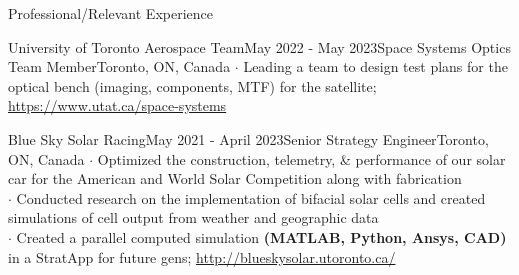 \documentclass[UTF8]{resume} %
\begin{document}
\begin{rSection}{Professional/Relevant Experience}
\begin{rSubsection}{University of Toronto Aerospace Team}{May 2022 - May 2023}{Space Systems Optics Team Member}{Toronto, ON, Canada}
    $\cdot$ Leading a team to design test plans for the optical bench (imaging, components, MTF) for the satellite; \href{https://www.utat.ca/space-systems}{https://www.utat.ca/space-systems}
\end{rSubsection}
\begin{rSubsection}{Blue Sky Solar Racing}{May 2021 - April 2023}{Senior Strategy Engineer}{Toronto, ON, Canada}
    $\cdot$ Optimized the construction, telemetry, \& performance of our solar car for the American and World Solar Competition along with fabrication\\
    $\cdot$ Conducted research on the implementation of bifacial solar cells and created simulations of cell output from weather and geographic data\\
    $\cdot$ Created a parallel computed simulation \textbf{(MATLAB, Python, Ansys, CAD)} in a StratApp for future gens; \href{http://blueskysolar.utoronto.ca/}{http://blueskysolar.utoronto.ca/}
\end{rSubsection}
\end{rSection}
~\vspace{-0.2cm}
\end{document}
